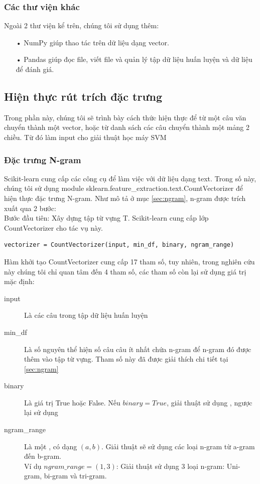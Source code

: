 \subsubsection*{Các thư viện khác}
Ngoài 2 thư viện kể trên, chúng tôi sử dụng thêm:
\begin{itemize}
\item[•] NumPy giúp thao tác trên dữ liệu dạng vector.
\item[•] Pandas giúp đọc file, viết file và quản lý tập dữ liệu huấn luyện và dữ liệu để đánh giá.
\end{itemize}
\subsection{Hiện thực rút trích đặc trưng}
Trong phần này, chúng tôi sẽ trình bày cách thức hiện thực để từ một câu văn chuyển thành một vector, hoặc từ danh sách các câu chuyển thành một mảng 2 chiều. Từ đó làm input cho giải thuật học máy SVM
\subsubsection*{Đặc trưng N-gram}
Scikit-learn cung cấp các công cụ để làm việc với dữ liệu dạng text. Trong số này, chúng tôi sử dụng module sklearn.feature\_extraction.text.CountVectorizer để hiện thực đặc trưng N-gram. Như mô tả ở mục \ref{sec:ngram}, n-gram được trích xuất qua 2 bước:\\

Bước đầu tiên: Xây dựng tập từ vựng T. Scikit-learn cung cấp lớp CountVectorizer cho tác vụ này.
\begin{lstlisting}
vectorizer = CountVectorizer(input, min_df, binary, ngram_range)
\end{lstlisting}
Hàm khởi tạo CountVectorizer cung cấp 17 tham số, tuy nhiên, trong nghiên cứu này chúng tôi chỉ quan tâm đến 4 tham số, các tham số còn lại sử dụng giá trị mặc định:
\begin{description}
\item[input] Là các câu trong tập dữ liệu huấn luyện
\item[min\_df] Là số nguyên thể hiện số câu câu ít nhất chứa n-gram để n-gram đó được thêm vào tập từ vựng. Tham số này đã được giải thích chi tiết tại \ref{sec:ngram}
\item[binary] Là giá trị True hoặc False. Nếu $binary=True$, giải thuật sử dụng \footnotemark, 
ngược lại sử dụng \footnotemark
 \item[ngram\_range] Là một , có dạng $(a, b)$. Giải thuật sẽ sử dụng các loại n-gram từ a-gram đến b-gram. \\
 Ví dụ $ngram\_range = (1,3)$: Giải thuật sử dụng 3 loại n-gram: Uni-gram, bi-gram và tri-gram.
\end{description}

